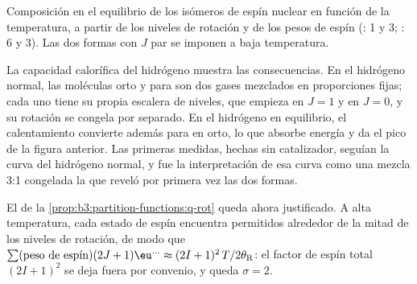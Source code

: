 \begin{omfigure}

{\small Composición en el equilibrio de los isómeros de espín nuclear en función de la
temperatura, a partir de los niveles de rotación y de los pesos de espín (: 1 y 3;
: 6 y 3). Las dos formas con $J$ par se imponen a baja temperatura.}
\end{omfigure}

La capacidad calorífica del hidrógeno muestra las consecuencias. En el hidrógeno normal, las
moléculas orto y para son dos gases mezclados en proporciones fijas; cada uno tiene su
propia escalera de niveles, que empieza en $J = 1$ y en $J = 0$, y su rotación se congela
por separado. En el hidrógeno en equilibrio, el calentamiento convierte además para en orto, lo que
absorbe energía y da el pico de la figura anterior. Las primeras medidas,
hechas sin catalizador, seguían la curva del hidrógeno normal, y fue la
interpretación de esa curva como una mezcla 3:1 congelada la que reveló por primera vez las
dos formas.

\begin{remark}
El  de la \cref{prop:b3:partition-functions:q-rot} queda ahora justificado.
A alta temperatura, cada estado de espín encuentra permitidos alrededor de la mitad de los niveles de rotación,
de modo que $\sum(\text{peso de espín})(2J+1)\eu^{\dots} \approx (2I+1)^2\,T/2\theta_{\mathrm R}$: el
factor de espín total $(2I+1)^2$ se deja fuera por convenio, y queda $\sigma = 2$.
\end{remark}

